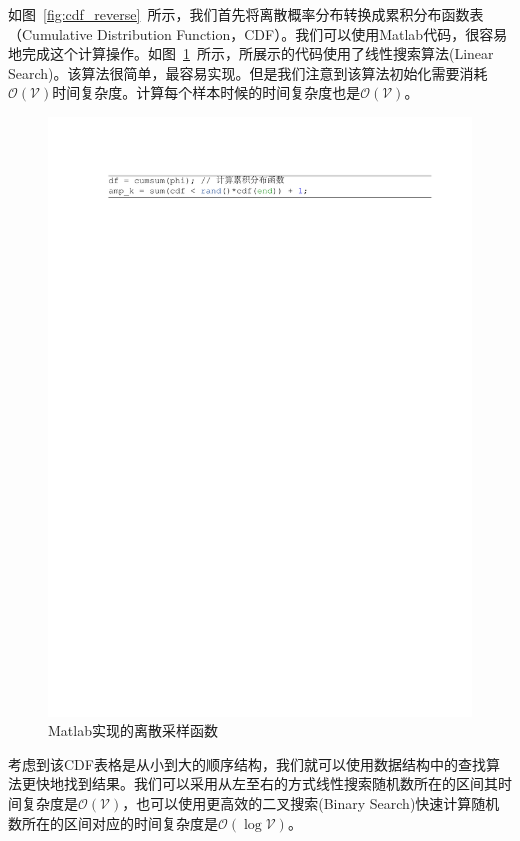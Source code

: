 如图~\ref{fig:cdf_reverse}~所示，我们首先将离散概率分布转换成累积分布函数表（Cumulative Distribution Function，CDF）。我们可以使用Matlab代码，很容易地完成这个计算操作。如图~\ref{fig:sample}~所示，所展示的代码使用了线性搜索算法(Linear Search)。该算法很简单，最容易实现。但是我们注意到该算法初始化需要消耗$\mathcal{O(\mathcal{V})}$时间复杂度。计算每个样本时候的时间复杂度也是$\mathcal{O(V)}$。
\begin{figure}[!t]
  \centering
\includegraphics[width=1\linewidth]{./figures/cdf.pdf}
\caption{Matlab实现的离散采样函数}\label{fig:sample}
\end{figure}


考虑到该CDF表格是从小到大的顺序结构，我们就可以使用数据结构中的查找算法更快地找到结果。我们可以采用从左至右的方式线性搜索随机数所在的区间其时间复杂度是$\mathcal{O}(\mathcal{V})$，也可以使用更高效的二叉搜索(Binary Search)快速计算随机数所在的区间对应的时间复杂度是$\mathcal{O}(\log \mathcal{V})$。



